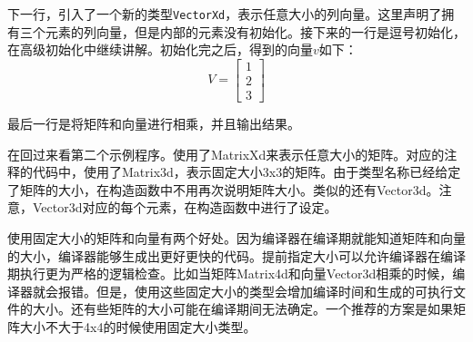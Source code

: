 下一行，引入了一个新的类型\verb|VectorXd|，表示任意大小的列向量。这里声明了拥有三个元素的列向量，但是内部的元素没有初始化。接下来的一行是逗号初始化，在高级初始化中继续讲解。初始化完之后，得到的向量$v$如下：
$$
V=
\begin{bmatrix}1\\2\\3\end{bmatrix}
$$

最后一行是将矩阵和向量进行相乘，并且输出结果。

在回过来看第二个示例程序。使用了MatrixXd来表示任意大小的矩阵。对应的注释的代码中，使用了Matrix3d，表示固定大小3x3的矩阵。由于类型名称已经给定了矩阵的大小，在构造函数中不用再次说明矩阵大小。类似的还有Vector3d。注意，Vector3d对应的每个元素，在构造函数中进行了设定。

使用固定大小的矩阵和向量有两个好处。因为编译器在编译期就能知道矩阵和向量的大小，编译器能够生成出更好更快的代码。提前指定大小可以允许编译器在编译期执行更为严格的逻辑检查。比如当矩阵Matrix4d和向量Vector3d相乘的时候，编译器就会报错。但是，使用这些固定大小的类型会增加编译时间和生成的可执行文件的大小。还有些矩阵的大小可能在编译期间无法确定。一个推荐的方案是如果矩阵大小不大于4x4的时候使用固定大小类型。
